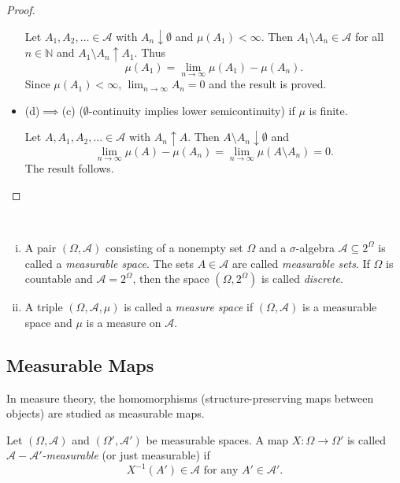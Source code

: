 \begin{proof}
\begin{itemize}
        Let $A_1,A_2,\ldots\in\mathcal{A}$ with $A_n\downarrow\emptyset$ and $\mu(A_1)<\infty$. Then $A_1\setminus A_n\in\mathcal{A}$ for all $n\in\mathbb{N}$ and $A_1\setminus A_n\uparrow A_1$. Thus
        $$\mu(A_1)=\lim_{n\to\infty}\mu(A_1)-\mu(A_n).$$
        Since $\mu(A_1)<\infty$, $\lim_{n\to\infty}A_n=0$ and the result is proved.
        
        \item (d)$\implies$(c) ($\emptyset$-continuity implies lower semicontinuity) if $\mu$ is finite.
        
        Let $A,A_1,A_2,\ldots\in\mathcal{A}$ with $A_n\uparrow A$. Then $A\setminus A_n\downarrow\emptyset$ and
        $$\lim_{n\to\infty}\mu(A)-\mu(A_n)=\lim_{n\to\infty}\mu(A\setminus A_n)=0.$$
        The result follows.
    \end{itemize}
\end{proof}

\begin{definition}
~
\begin{enumerate}[(i)]
    \item A pair $(\Omega,\mathcal{A})$ consisting of a nonempty set $\Omega$ and a $\sigma$-algebra $\mathcal{A}\subseteq2^\Omega$ is called a \textit{measurable space}. The sets $A\in\mathcal{A}$ are called \textit{measurable sets}. If $\Omega$ is countable and $\mathcal{A}=2^\Omega$, then the space $(\Omega,2^\Omega)$ is called \textit{discrete}.
    
    \item A triple $(\Omega,\mathcal{A},\mu)$ is called a \textit{measure space} if $(\Omega,\mathcal{A})$ is a measurable space and $\mu$ is a measure on $\mathcal{A}$.
\end{enumerate}
\end{definition}

\subsection{Measurable Maps}

In measure theory, the homomorphisms (structure-preserving maps between objects) are studied as measurable maps.

\begin{definition}
    Let $(\Omega,\mathcal{A})$ and $(\Omega',\mathcal{A}')$ be measurable spaces. A map $X:\Omega\to\Omega'$ is called \textit{$\mathcal{A}-\mathcal{A}'$-measurable} (or just measurable) if
    $$X^{-1}(A')\in\mathcal{A}\text{ for any }A'\in\mathcal{A}'.$$
\end{definition}

